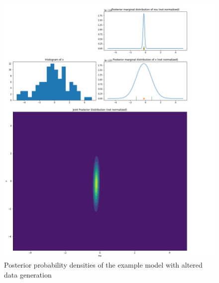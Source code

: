 \documentclass{article}
\begin{document}
\begin{figure}
	\includegraphics[width=\textwidth]{images/ground_truth_posterior_6_cut.png}
	\caption[Posterior probability densities of the example model with altered data generation]{Posterior probability densities of the example model with altered data generation}
	\label{fig:ground_truth_posterior_6}
\end{figure}
\end{document}
